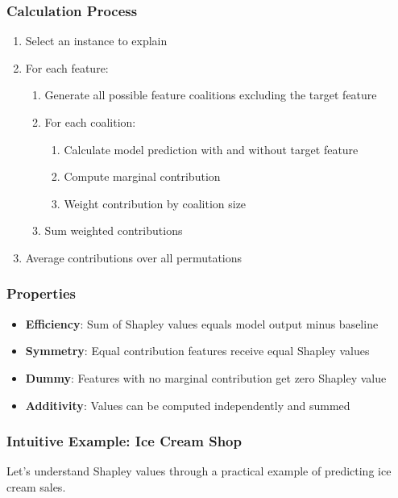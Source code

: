 \documentclass{article}
\begin{document}
\subsubsection{Calculation Process}
\begin{enumerate}
    \item Select an instance to explain
    \item For each feature:
    \begin{enumerate}
        \item Generate all possible feature coalitions excluding the target feature
        \item For each coalition:
        \begin{enumerate}
            \item Calculate model prediction with and without target feature
            \item Compute marginal contribution
            \item Weight contribution by coalition size
        \end{enumerate}
        \item Sum weighted contributions
    \end{enumerate}
    \item Average contributions over all permutations
\end{enumerate}

\subsubsection{Properties}
\begin{itemize}
    \item \textbf{Efficiency}: Sum of Shapley values equals model output minus baseline
    \item \textbf{Symmetry}: Equal contribution features receive equal Shapley values
    \item \textbf{Dummy}: Features with no marginal contribution get zero Shapley value
    \item \textbf{Additivity}: Values can be computed independently and summed
\end{itemize}

\subsubsection{Intuitive Example: Ice Cream Shop}
Let's understand Shapley values through a practical example of predicting ice cream sales.
\end{document}
